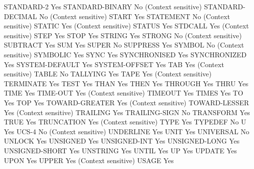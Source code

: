 STANDARD-2                      Yes
STANDARD-BINARY                 No (Context sensitive)
STANDARD-DECIMAL                No (Context sensitive)
START                           Yes
STATEMENT                       No (Context sensitive)
STATIC                          Yes (Context sensitive)
STATUS                          Yes
STDCALL                         Yes (Context sensitive)
STEP                            Yes
STOP                            Yes
STRING                          Yes
STRONG                          No (Context sensitive)
SUBTRACT                        Yes
SUM                             Yes
SUPER                           No
SUPPRESS                        Yes
SYMBOL                          No (Context sensitive)
SYMBOLIC                        Yes
SYNC                            Yes
SYNCHRONISED                    Yes
SYNCHRONIZED                    Yes
SYSTEM-DEFAULT                  Yes
SYSTEM-OFFSET                   Yes
TAB                             Yes (Context sensitive)
TABLE                           No
TALLYING                        Yes
TAPE                            Yes (Context sensitive)
TERMINATE                       Yes
TEST                            Yes
THAN                            Yes
THEN                            Yes
THROUGH                         Yes
THRU                            Yes
TIME                            Yes
TIME-OUT                        Yes (Context sensitive)
TIMEOUT                         Yes
TIMES                           Yes
TO                              Yes
TOP                             Yes
TOWARD-GREATER                  Yes (Context sensitive)
TOWARD-LESSER                   Yes (Context sensitive)
TRAILING                        Yes
TRAILING-SIGN                   No
TRANSFORM                       Yes
TRUE                            Yes
TRUNCATION                      Yes (Context sensitive)
TYPE                            Yes
TYPEDEF                         No
U                               Yes
UCS-4                           No (Context sensitive)
UNDERLINE                       Yes
UNIT                            Yes
UNIVERSAL                       No
UNLOCK                          Yes
UNSIGNED                        Yes
UNSIGNED-INT                    Yes
UNSIGNED-LONG                   Yes
UNSIGNED-SHORT                  Yes
UNSTRING                        Yes
UNTIL                           Yes
UP                              Yes
UPDATE                          Yes
UPON                            Yes
UPPER                           Yes (Context sensitive)
USAGE                           Yes
